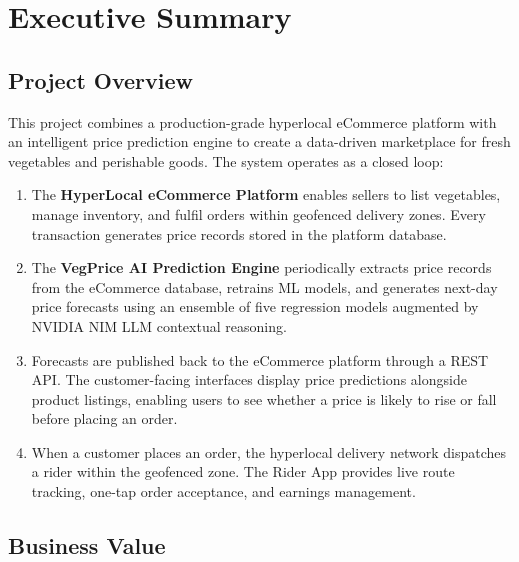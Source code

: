 \documentclass[12pt, a4paper, oneside]{report}
\begin{document}
\tableofcontents
\newpage
\listoftables
{}
\newpage

\chapter{Executive Summary}

\section{Project Overview}

This project combines a production-grade hyperlocal eCommerce platform with an
intelligent price prediction engine to create a data-driven marketplace for
fresh vegetables and perishable goods. The system operates as a closed loop:

\begin{enumerate}
  \item The \textbf{HyperLocal eCommerce Platform} enables sellers to list
        vegetables, manage inventory, and fulfil orders within geofenced delivery
        zones. Every transaction generates price records stored in the platform
        database.
  \item The \textbf{VegPrice AI Prediction Engine} periodically extracts price
        records from the eCommerce database, retrains ML models, and generates
        next-day price forecasts using an ensemble of five regression models
        augmented by NVIDIA NIM LLM contextual reasoning.
  \item Forecasts are published back to the eCommerce platform through a REST
        API. The customer-facing interfaces display price predictions alongside
        product listings, enabling users to see whether a price is likely to
        rise or fall before placing an order.
  \item When a customer places an order, the hyperlocal delivery network
        dispatches a rider within the geofenced zone. The Rider App provides
        live route tracking, one-tap order acceptance, and earnings management.
\end{enumerate}

\section{Business Value}
\end{document}

